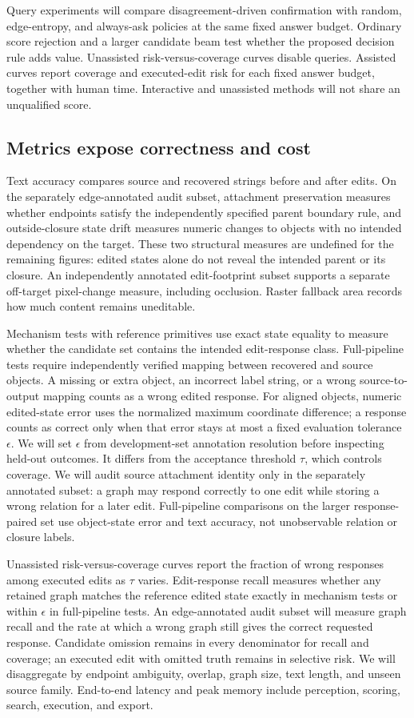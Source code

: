 \documentclass{article}
\begin{document}
Query experiments will compare disagreement-driven confirmation with random, edge-entropy, and always-ask policies at the same fixed answer budget. Ordinary score rejection and a larger candidate beam test whether the proposed decision rule adds value. Unassisted risk-versus-coverage curves disable queries. Assisted curves report coverage and executed-edit risk for each fixed answer budget, together with human time. Interactive and unassisted methods will not share an unqualified score.

\subsection{Metrics expose correctness and cost}
Text accuracy compares source and recovered strings before and after edits. On the separately edge-annotated audit subset, attachment preservation measures whether endpoints satisfy the independently specified parent boundary rule, and outside-closure state drift measures numeric changes to objects with no intended dependency on the target. These two structural measures are undefined for the remaining figures: edited states alone do not reveal the intended parent or its closure. An independently annotated edit-footprint subset supports a separate off-target pixel-change measure, including occlusion. Raster fallback area records how much content remains uneditable.

Mechanism tests with reference primitives use exact state equality to measure whether the candidate set contains the intended edit-response class. Full-pipeline tests require independently verified mapping between recovered and source objects. A missing or extra object, an incorrect label string, or a wrong source-to-output mapping counts as a wrong edited response. For aligned objects, numeric edited-state error uses the normalized maximum coordinate difference; a response counts as correct only when that error stays at most a fixed evaluation tolerance $\epsilon$. We will set $\epsilon$ from development-set annotation resolution before inspecting held-out outcomes. It differs from the acceptance threshold $\tau$, which controls coverage. We will audit source attachment identity only in the separately annotated subset: a graph may respond correctly to one edit while storing a wrong relation for a later edit. Full-pipeline comparisons on the larger response-paired set use object-state error and text accuracy, not unobservable relation or closure labels.

Unassisted risk-versus-coverage curves report the fraction of wrong responses among executed edits as $\tau$ varies. Edit-response recall measures whether any retained graph matches the reference edited state exactly in mechanism tests or within $\epsilon$ in full-pipeline tests. An edge-annotated audit subset will measure graph recall and the rate at which a wrong graph still gives the correct requested response. Candidate omission remains in every denominator for recall and coverage; an executed edit with omitted truth remains in selective risk. We will disaggregate by endpoint ambiguity, overlap, graph size, text length, and unseen source family. End-to-end latency and peak memory include perception, scoring, search, execution, and export.
\end{document}
